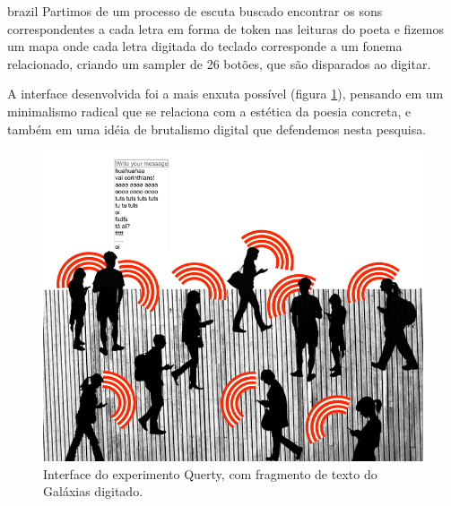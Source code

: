 \begin{otherlanguage*}{brazil}
Partimos de um processo de escuta buscado encontrar os sons correspondentes a cada letra em forma de token nas leituras do poeta e fizemos um mapa onde cada letra digitada do teclado corresponde a um fonema relacionado, criando um sampler de 26 botões, que são disparados ao digitar.

A interface desenvolvida foi a mais enxuta possível (figura \ref{qwerty}), pensando em um minimalismo radical que se relaciona com a estética da poesia concreta, e também em uma idéia de brutalismo digital que defendemos nesta pesquisa.

\begin{figure}[htb]
    \caption{\label{qwerty}Interface do experimento Querty, com fragmento de texto do Galáxias digitado. }
    \begin{center}
    \includegraphics[width=1\linewidth]{pictures/banda_aberta_mob_crowd.png}
    \end{center}
\end{figure}






\end{otherlanguage*}

